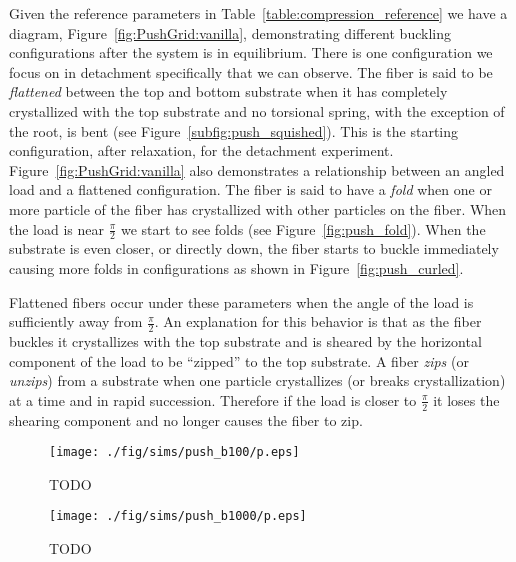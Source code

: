 Given the reference parameters in Table~\ref{table:compression_reference} we have a diagram, Figure~\ref{fig:PushGrid:vanilla}, demonstrating different buckling configurations after the system is in equilibrium. There is one configuration we focus on in detachment specifically that we can observe. The fiber is said to be \textit{flattened} between the top and bottom substrate when it has completely crystallized with the top substrate and no torsional spring, with the exception of the root, is bent (see Figure~\ref{subfig:push_squished}). This is the starting configuration, after relaxation, for the detachment experiment. Figure~\ref{fig:PushGrid:vanilla} also demonstrates a relationship between an angled load and a flattened configuration. The fiber is said to have a \textit{fold} when one or more particle of the fiber has crystallized with other particles on the fiber. When the load is near $\frac{\pi}{2}$ we start to see folds (see Figure~\ref{fig:push_fold}). When the substrate is even closer, or directly down, the fiber starts to buckle immediately causing more folds in configurations as shown in Figure~\ref{fig:push_curled}.

Flattened fibers occur under these parameters when the angle of the load is sufficiently away from $\frac{\pi}{2}$. An explanation for this behavior is that as the fiber buckles it crystallizes with the top substrate and is sheared by the horizontal component of the load to be ``zipped'' to the top substrate. A fiber \textit{zips} (or \textit{unzips}) from a substrate when one particle crystallizes (or breaks crystallization) at a time and in rapid succession. Therefore if the load is closer to $\frac{\pi}{2}$ it loses the shearing component and no longer causes the fiber to zip.

	\begin{figure}
		\begin{center}
			\texttt{[image: ./fig/sims/push\_b100/p.eps]}
		\end{center}		
		\caption{ TODO
		\label{fig:PushGrid:b100}}
	\end{figure}	
	
	\begin{figure}
		\begin{center}
			\texttt{[image: ./fig/sims/push\_b1000/p.eps]}
		\end{center}		
		\caption{ TODO
		\label{fig:PushGrid:b1000}}
	\end{figure}
	

